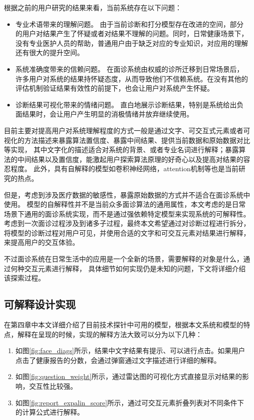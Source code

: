 根据之前的用户研究的结果来看，当前系统存在以下问题：

\begin{itemize}
    \item 专业术语带来的理解问题。
    由于当前诊断和打分模型存在改进的空间，部分的用户对结果产生了怀疑或者对结果不理解的问题。同时，日常健康场景下，没有专业医护人员的帮助，普通用户由于缺乏对应的专业知识，对应用的理解还有很大的提升空间。
    \item 系统准确度带来的信赖问题。
    在面诊系统由权威的诊所迁移到日常场景后，许多用户对系统的结果持怀疑态度，从而导致他们不信赖系统。在没有其他的评估机制验证结果有效性的前提下，也会让用户对系统产生怀疑。
    \item 诊断结果可视化带来的情绪问题。
    直白地展示诊断结果，特别是系统给出负面结果时，会让用户产生明显的消极情绪并放弃继续使用。
\end{itemize}


目前主要对提高用户对系统理解程度的方式一般是通过文字、可交互式元素或者可视化的方法描述来暴露算法置信度、暴露中间结果、提供当前数据和原始数据对比等实现\cite{wang2019designing, kocielnik2019will}，
其中文字化的描述适合对系统的背景、或者专业名词进行解释；暴露算法的中间结果以及置信度，能激起用户探索算法原理的好奇心以及提高对结果的容忍程度。
此外，具有自解释的模型如卷积神经网络，attention机制等也是当前研究的热点。

但是，考虑到涉及医疗数据的敏感性，暴露原始数据的方式并不适合在面诊系统中使用。
模型的自解释性并不是当前众多面诊算法的通用属性，本文考虑的是日常场景下通用的面诊系统实现，而不是通过强依赖特定模型来实现系统的可解释性。
考虑到一次面诊过程涉及到诸多子过程，最终本文希望通过对诊断过程进行拆分，将模型的诊断过程对用户可见，并使用合适的文字和可交互元素对结果进行解释，来提高用户的交互体验。


不过面诊系统在日常生活中的应用是一个全新的场景，需要解释的对象是什么，通过何种交互元素进行解释，
具体细节如何实现仍是未知的问题，下文将详细介绍该探索过程。


\subsection{可解释设计实现}

在第四章中本文详细介绍了目前技术探针中可用的模型，根据本文系统和模型的特点，解释在呈现的时候，实现的解释方法大致可以分为以下几种：

\begin{enumerate}
    \item 如图\ref{fig:face_diags}所示，结果中文字结果有提示、可以进行点击。如果用户点击了健康报告的分数，会通过弹窗通过文字描述进行详细的解释。

    \item 如图\ref{fig:question_weight}所示，通过雷达图的可视化方式直接显示对结果的影响，交互性比较强。 
    
    \item 如图\ref{fig:report_expalin_score}所示，通过可交互元素折叠列表对不同条件下的计算公式进行解释。
\end{enumerate}

